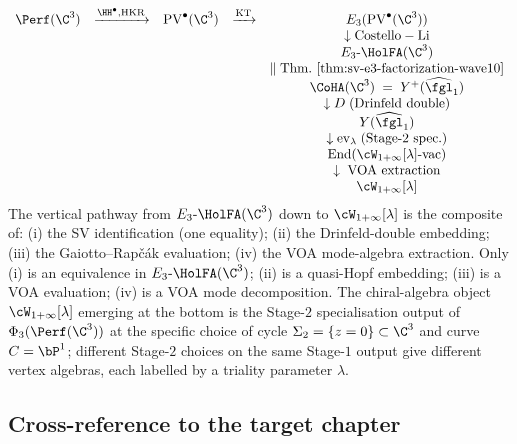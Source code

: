 \begin{remark}
\label{rem:master-diagram-wave10}
\[
 \begin{array}{ccccc}
 \Perf(\C^3) & \xrightarrow{\HH^\bullet, \text{HKR}} & \mathrm{PV}^\bullet(\C^3) & \xrightarrow{\mathrm{KT}} & E_3(\mathrm{PV}^\bullet(\C^3)) \\
 & & & & \downarrow \mathrm{Costello-Li} \\
 & & & & E_3\text{-}\HolFA(\C^3) \\
 & & & & \|\;\mathrm{Thm.}~\ref{thm:sv-e3-factorization-wave10} \\
 & & & & \CoHA(\C^3) \;=\; Y^+(\widehat{\fgl}_1) \\
 & & & & \downarrow D\;\text{(Drinfeld double)} \\
 & & & & Y(\widehat{\fgl}_1) \\
 & & & & \downarrow \mathrm{ev}_\lambda\;\text{(Stage-$2$ spec.)} \\
 & & & & \mathrm{End}(\cW_{1+\infty}[\lambda]\text{-vac}) \\
 & & & & \downarrow\;\text{VOA extraction} \\
 & & & & \cW_{1+\infty}[\lambda] \\
 \end{array}
\]
The vertical pathway from $E_3\text{-}\HolFA(\C^3)$ down to
$\cW_{1+\infty}[\lambda]$ is the composite of: (i) the SV identification
(one equality); (ii) the Drinfeld-double embedding; (iii) the
Gaiotto--Rap\v{c}\'ak evaluation; (iv) the VOA mode-algebra
extraction. Only (i) is an equivalence in $E_3\text{-}\HolFA(\C^3)$;
(ii) is a quasi-Hopf embedding; (iii) is a VOA evaluation; (iv) is a
VOA mode decomposition. The chiral-algebra object $\cW_{1+\infty}[\lambda]$
emerging at the bottom is the Stage-$2$ specialisation output of
$\Phi_3(\Perf(\C^3))$ at the specific choice of cycle
$\Sigma_2 = \{z = 0\} \subset \C^3$ and curve $C = \bP^1$; different
Stage-$2$ choices on the same Stage-$1$ output give different vertex
algebras, each labelled by a triality parameter $\lambda$.
\end{remark}

\subsection*{Cross-reference to the target chapter}

